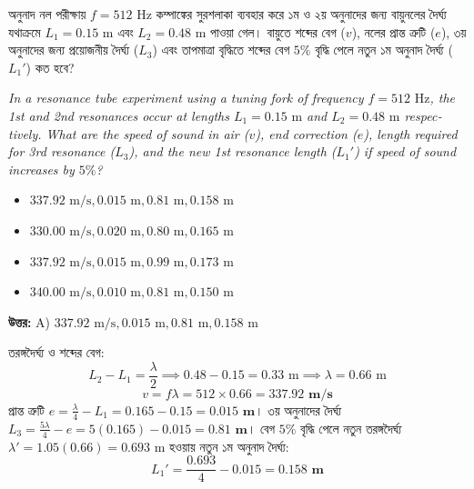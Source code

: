 \documentclass[12pt, a4paper]{article}
\begin{document}
\vspace{2em}

\begin{tcolorbox}[questionbox={প্রশ্ন (Question) 23}]
    \noindent
    অনুনাদ নল পরীক্ষায় $f = 512\text{ Hz}$ কম্পাঙ্কের সুরশলাকা ব্যবহার করে ১ম ও ২য় অনুনাদের জন্য বায়ুনলের দৈর্ঘ্য যথাক্রমে $L_1 = 0.15\text{ m}$ এবং $L_2 = 0.48\text{ m}$ পাওয়া গেল। বায়ুতে শব্দের বেগ ($v$), নলের প্রান্ত ত্রুটি ($e$), ৩য় অনুনাদের জন্য প্রয়োজনীয় দৈর্ঘ্য ($L_3$) এবং তাপমাত্রা বৃদ্ধিতে শব্দের বেগ $5\%$ বৃদ্ধি পেলে নতুন ১ম অনুনাদ দৈর্ঘ্য ($L_1'$) কত হবে?
    
    \vspace{0.8em}
    \begin{english}
    \noindent\textit{\color{darkgray}
    In a resonance tube experiment using a tuning fork of frequency $f = 512\text{ Hz}$, the 1st and 2nd resonances occur at lengths $L_1 = 0.15\text{ m}$ and $L_2 = 0.48\text{ m}$ respectively. What are the speed of sound in air ($v$), end correction ($e$), length required for 3rd resonance ($L_3$), and the new 1st resonance length ($L_1'$) if speed of sound increases by $5\%$?
    }
    \end{english}
\end{tcolorbox}

\begin{itemize}[label={}, leftmargin=1cm, itemsep=0.5em]
    \item[\textbf{A)}] $337.92\text{ m/s}, 0.015\text{ m}, 0.81\text{ m}, 0.158\text{ m}$
    \item[\textbf{B)}] $330.00\text{ m/s}, 0.020\text{ m}, 0.80\text{ m}, 0.165\text{ m}$
    \item[\textbf{C)}] $337.92\text{ m/s}, 0.015\text{ m}, 0.99\text{ m}, 0.173\text{ m}$
    \item[\textbf{D)}] $340.00\text{ m/s}, 0.010\text{ m}, 0.81\text{ m}, 0.150\text{ m}$
\end{itemize}

\vspace{0.5em}
\begin{tcolorbox}[answerbox]
    \textbf{\color{success} উত্তর:} A) $337.92\text{ m/s}, 0.015\text{ m}, 0.81\text{ m}, 0.158\text{ m}$
\end{tcolorbox}
\vspace{1em}

\begin{tcolorbox}[solutionbox={সমাধান (Solution)}]
    \noindent
    তরঙ্গদৈর্ঘ্য ও শব্দের বেগ:
    \[ L_2 - L_1 = \frac{\lambda}{2} \implies 0.48 - 0.15 = 0.33\text{ m} \implies \lambda = 0.66\text{ m} \]
    \[ v = f \lambda = 512 \times 0.66 = \mathbf{337.92\text{ m/s}} \]
    প্রান্ত ত্রুটি $e = \frac{\lambda}{4} - L_1 = 0.165 - 0.15 = \mathbf{0.015\text{ m}}$। ৩য় অনুনাদের দৈর্ঘ্য $L_3 = \frac{5\lambda}{4} - e = 5(0.165) - 0.015 = \mathbf{0.81\text{ m}}$। বেগ $5\%$ বৃদ্ধি পেলে নতুন তরঙ্গদৈর্ঘ্য $\lambda' = 1.05(0.66) = 0.693\text{ m}$ হওয়ায় নতুন ১ম অনুনাদ দৈর্ঘ্য:
    \[ L_1' = \frac{0.693}{4} - 0.015 = \mathbf{0.158\text{ m}} \]
\end{tcolorbox}
\end{document}
